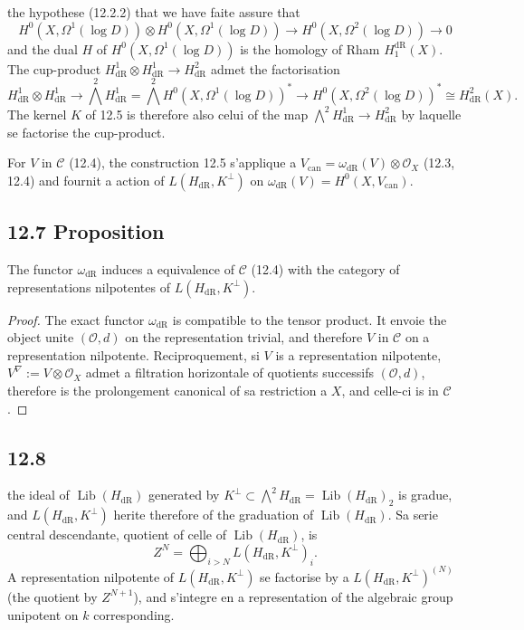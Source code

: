 \documentclass[12pt,a4paper]{article}
\theoremstyle{plain}
\theoremstyle{definition}
\theoremstyle{remark}
\DeclareMathOperator{\Lib}{Lib}
\newcommand{\cC}{\mathcal{C}}
\newcommand{\cO}{\mathcal{O}}
\newcommand{\dr}{\mathrm{dR}}
\begin{document}
the hypothese (12.2.2) that we have faite assure that
\begin{equation}\label{eq:12.6.1}
H^0(X, \Omega^1(\log D)) \otimes H^0(X, \Omega^1(\log D)) \to H^0(X, \Omega^2(\log D)) \to 0
\end{equation}
and the dual $H$ of $H^0(X, \Omega^1(\log D))$ is the homology of Rham $H_1^{\dr}(X)$. The cup-product $H^1_{\dr} \otimes H^1_{\dr} \to H^2_{\dr}$ admet the factorisation
\[
H^1_{\dr} \otimes H^1_{\dr} \to \textstyle\bigwedge^2 H^1_{\dr} = \bigwedge^2 H^0(X, \Omega^1(\log D))^* \to H^0(X, \Omega^2(\log D))^* \cong H^2_{\dr}(X).
\]
The kernel $K$ of 12.5 is therefore also celui of the map $\bigwedge^2 H^1_{\dr} \to H^2_{\dr}$ by laquelle se factorise the cup-product.

For $V$ in $\cC$ (12.4), the construction 12.5 s'applique a $V_{\text{can}} = \omega_{\dr}(V) \otimes \cO_X$ (12.3, 12.4) and fournit a action of $L(H_{\dr}, K^\perp)$ on $\omega_{\dr}(V) = H^0(X, V_{\text{can}})$.

\subsection*{12.7 Proposition}

The functor $\omega_{\dr}$ induces a equivalence of $\cC$ (12.4) with the category of representations nilpotentes of $L(H_{\dr}, K^\perp)$.

\begin{proof}
The exact functor $\omega_{\dr}$ is compatible to the tensor product. It envoie the object unite $(\cO, d)$ on the representation trivial, and therefore $V$ in $\cC$ on a representation nilpotente. Reciproquement, si $V$ is a representation nilpotente, $V^\nabla := V \otimes \cO_X$ admet a filtration horizontale of quotients successifs $(\cO, d)$, therefore is the prolongement canonical of sa restriction a $X$, and celle-ci is in $\cC$.
\end{proof}

\subsection*{12.8}

the ideal of $\Lib(H_{\dr})$ generated by $K^\perp \subset \bigwedge^2 H_{\dr} = \Lib(H_{\dr})_2$ is gradue, and $L(H_{\dr}, K^\perp)$ herite therefore of the graduation of $\Lib(H_{\dr})$. Sa serie central descendante, quotient of celle of $\Lib(H_{\dr})$, is
\[
Z^N = \bigoplus_{i > N} L(H_{\dr}, K^\perp)_i.
\]
A representation nilpotente of $L(H_{\dr}, K^\perp)$ se factorise by a $L(H_{\dr}, K^\perp)^{(N)}$ (the quotient by $Z^{N+1}$), and s'integre en a representation of the algebraic group unipotent on $k$ corresponding.
\end{document}
